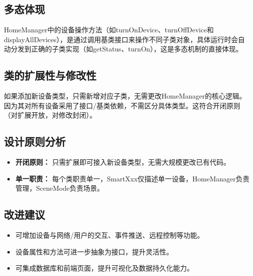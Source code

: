 \documentclass[12pt,hyperref,a4paper,UTF8]{ctexart}
\begin{document}
\subsection{多态体现}
HomeManager中的设备操作方法（如turnOnDevice、turnOffDevice和displayAllDevices），是通过调用基类接口来操作不同子类对象，具体运行时会自动分发到正确的子类实现（如getStatus、turnOn），这是多态机制的直接体现。

\subsection{类的扩展性与修改性}
如果添加新设备类型，只需新增对应子类，无需更改HomeManager的核心逻辑。因为其对所有设备采用了接口/基类依赖，不需区分具体类型。这符合开闭原则（对扩展开放，对修改封闭）。

\subsection{设计原则分析}
\begin{itemize}
  \item \textbf{开闭原则：} 只需扩展即可接入新设备类型，无需大规模更改已有代码。
  \item \textbf{单一职责：} 每个类职责单一，SmartXxx仅描述单一设备，HomeManager负责管理，SceneMode负责场景。
\end{itemize}

\subsection{改进建议}
\begin{itemize}
    \item 可增加设备与网络/用户的交互、事件推送、远程控制等功能。
    \item 设备属性和方法可进一步抽象为接口，提升灵活性。
    \item 可集成数据库和前端页面，提升可视化及数据持久化能力。
\end{itemize}

\end{document}
